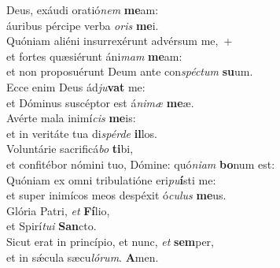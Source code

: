 \evenverse Deus, exáudi oratió\textit{nem} \textbf{me}am:~\*\\
\evenverse áuribus pércipe verba \textit{o}\textit{ris} \textbf{me}i.\\
\oddverse Quóniam aliéni insurrexérunt advérsum me,~+\\
\oddverse  et fortes quæsiérunt áni\textit{mam} \textbf{me}am:~\*\\
\oddverse et non proposuérunt Deum ante con\textit{spé}\textit{ctum} \textbf{su}um.\\
\evenverse Ecce enim Deus ád\textit{ju}\textbf{vat} me:~\*\\
\evenverse et Dóminus suscéptor est á\textit{ni}\textit{mæ} \textbf{me}æ.\\
\oddverse Avérte mala inimí\textit{cis} \textbf{me}is:~\*\\
\oddverse et in veritáte tua di\textit{spér}\textit{de} \textbf{il}los.\\
\evenverse Voluntárie sacrificá\textit{bo} \textbf{ti}bi,~\*\\
\evenverse et confitébor nómini tuo, Dómine: quó\textit{ni}\textit{am} \textbf{bo}num est:\\
\oddverse Quóniam ex omni tribulatióne eri\textit{pu}\textbf{í}sti me:~\*\\
\oddverse et super inimícos meos despéxit ó\textit{cu}\textit{lus} \textbf{me}us.\\
\evenverse Glória Patri, \textit{et} \textbf{Fí}lio,~\*\\
\evenverse et Spirí\textit{tu}\textit{i} \textbf{San}cto.\\
\oddverse Sicut erat in princípio, et nunc, \textit{et} \textbf{sem}per,~\*\\
\oddverse et in sǽcula sæcu\textit{ló}\textit{rum}. \textbf{A}men.\\
